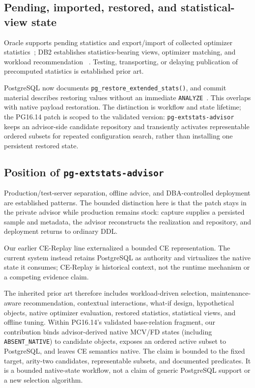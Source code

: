 \subsection{Pending, imported, restored, and statistical-view state}

Oracle supports pending statistics and export/import of collected optimizer
statistics~\cite{oraclependingstats,oracleimportstats}; DB2 establishes
statistics-bearing views, optimizer matching, and workload recommendation
~\cite{db2statviews}.  Testing, transporting, or delaying publication of
precomputed statistics is established prior art.

\begin{sloppypar}
PostgreSQL now documents
\texttt{pg\_restore\_}\allowbreak\texttt{extended\_stats()}, and
commit material describes restoring values without an immediate
\texttt{ANALYZE}~\cite{postgresql19restore,postgresql19restorecommit}.  This
overlaps with native payload restoration.  The distinction is workflow and
state lifetime; the PG16.14 patch is scoped to the validated version:
\texttt{pg-extstats-advisor} keeps an advisor-side candidate repository and
transiently activates representable ordered subsets for repeated configuration
search, rather than installing one persistent restored state.
\end{sloppypar}

\subsection{Position of \texorpdfstring{\texttt{pg-extstats-advisor}}{pg-extstats-advisor}}

Production/test-server separation, offline advice, and DBA-controlled
deployment are established patterns.  The bounded distinction here is that
the patch stays in the private advisor while production remains stock:
capture supplies a persisted sample and metadata, the advisor reconstructs the
realization and repository, and deployment returns to ordinary DDL.

Our earlier CE-Replay line externalized a bounded CE representation.  The
current system instead retains PostgreSQL as authority and virtualizes the
native state it consumes; CE-Replay is historical context, not the runtime
mechanism or a competing evidence claim.

The inherited prior art therefore includes workload-driven selection,
maintenance-aware recommendation, contextual interactions, what-if design,
hypothetical objects, native optimizer evaluation, restored statistics,
statistical views, and offline tuning.  Within PG16.14's validated
base-relation fragment, our contribution binds advisor-derived native MCV/FD
states (including \texttt{ABSENT\_NATIVE}) to candidate objects, exposes an
ordered active subset to PostgreSQL, and leaves CE semantics native.  The
claim is bounded to the fixed target, arity-two candidates, representable
subsets, and documented predicates.  It is a bounded native-state workflow,
not a claim of generic PostgreSQL support or a new selection algorithm.
